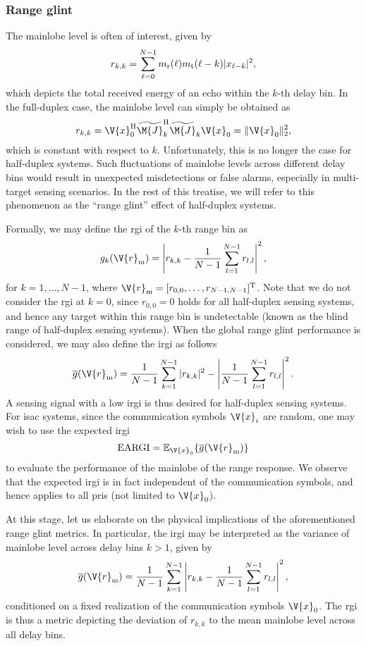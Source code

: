\documentclass[journal,a4paper,10pt, romanappendices]{IEEEtran}
\begin{document}
\subsubsection{Range glint}
The mainlobe level is often of interest, given by
\begin{equation}\label{mainlobe}
r_{k,k}=\sum_{\ell=0}^{N-1} m_{\rm r}(\ell)m_{\rm t}(\ell-k)|x_{\ell-k}|^2,
\end{equation}
which depicts the total received energy of an echo within the $k$-th delay bin. In the full-duplex case, the mainlobe level can simply be obtained as
$$
r_{k,k}= \V{x}_0^{\rm H} \widetilde{\M{J}}_k^{\rm H}\widetilde{\M{J}}_k\V{x}_0 = \|\V{x}_0\|_2^2,
$$
which is constant with respect to $k$. Unfortunately, this is no longer the case for half-duplex systems. Such fluctuations of mainlobe levels across different delay bins would result in unexpected misdetections or false alarms, especially in multi-target sensing scenarios. In the rest of this treatise, we will refer to this phenomenon as the ``range glint'' effect of half-duplex systems. 

Formally, we may define the \acf{rgi} of the $k$-th range bin as
\begin{equation}\label{rgi_def}
g_k(\V{r}_{\rm m}) = \left|r_{k,k} - \frac{1}{N-1} \sum_{l=1}^{N-1} r_{l,l}\right|^2,
\end{equation}
for $k=1,\dotsc,N-1$, where $\V{r}_{\rm m}=[r_{0,0},\dotsc,r_{N-1,N-1}]^{\rm T}$. Note that we do not consider the \ac{rgi} at $k=0$, since $r_{0,0}=0$ holds for all half-duplex sensing systems, and hence any target within this range bin is undetectable (known as the blind range of half-duplex sensing systems). When the global range glint performance is considered, we may also define the \acf{irgi} as follows
\begin{equation}\label{argi_definition}
\overline{g}(\V{r}_{\rm m}) = \frac{1}{N-1}\sum_{k=1}^{N-1} |r_{k,k}|^2 - \left|\frac{1}{N-1} \sum_{l=1}^{N-1} r_{l,l}\right|^2.
\end{equation}
A sensing signal with a low \ac{irgi} is thus desired for half-duplex sensing systems. For \ac{isac} systems, since the communication symbols $\V{x}_i$ are random, one may wish to use the expected \ac{irgi}
$$
{\rm EARGI} = \mathbb{E}_{\V{x}_0}\{\overline{g}(\V{r}_{\rm m})\}
$$
to evaluate the performance of the mainlobe of the range response. We observe that the expected \ac{irgi} is in fact independent of the communication symbols, and hence applies to all \ac{pri}s (not limited to $\V{x}_0$).
\begin{remark}
At this stage, let us elaborate on the physical implications of the aforementioned range glint metrics. In particular, the \ac{irgi} may be interpreted as the variance of mainlobe level across delay bins $k>1$, given by
$$
\overline{g}(\V{r}_{\rm m}) = \frac{1}{N-1}\sum_{k=1}^{N-1} \left|r_{k,k} - \frac{1}{N-1}\sum_{l=1}^{N-1} r_{l,l}\right|^2,
$$
conditioned on a fixed realization of the communication symbols $\V{x}_0$. The \ac{rgi} is thus a metric depicting the deviation of $r_{k,k}$ to the mean mainlobe level across all delay bins.
\end{remark}
\end{document}
